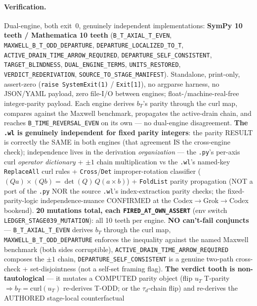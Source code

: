 \paragraph{Verification.}
Dual-engine, both exit~0, genuinely independent implementations: \textbf{SymPy 10
teeth / Mathematica 10 teeth} (\texttt{B\_T\_AXIAL\_T\_EVEN},
\texttt{MAXWELL\_B\_T\_ODD\_DEPARTURE}, \texttt{DEPARTURE\_LOCALIZED\_TO\_T},
\texttt{ACTIVE\_DRAIN\_TIME\_ARROW\_REQUIRED}, \texttt{DEPARTURE\_SELF\_CONSISTENT},
\texttt{TARGET\_BLINDNESS}, \texttt{DUAL\_ENGINE\_TERMS}, \texttt{UNITS\_RESTORED},
\texttt{VERDICT\_REDERIVATION}, \texttt{SOURCE\_TO\_STAGE\_MANIFEST}). Standalone,
print-only, assert-zero (\texttt{raise SystemExit(1)} / \texttt{Exit[1]}), no argparse
harness, no JSON/YAML payload, zero file-I/O between engines; float-/machine-real-free
integer-parity payload. Each engine derives \(b_T\)'s parity through the curl map,
compares against the Maxwell benchmark, propagates the active-drain chain, and reaches
\texttt{B\_TIME\_REVERSAL\_EVEN} on its own --- no dual-engine disagreement. \textbf{The
\texttt{.wl} is genuinely independent for fixed parity integers}: the parity RESULT is
correctly the SAME in both engines (that agreement IS the cross-engine check);
independence lives in the derivation \emph{organization} --- the \texttt{.py}'s
per-axis curl \emph{operator dictionary} + \(\pm1\) chain multiplication vs the
\texttt{.wl}'s named-key \texttt{ReplaceAll} curl rules + \texttt{Cross}/\texttt{Det}
improper-rotation classifier (\((Qa)\times(Qb)=\det(Q)\,Q(a\times b)\)) +
\texttt{FoldList} parity propagation (NOT a port of the \texttt{.py} NOR the source
\texttt{.wl}'s index-extraction parity checks; the fixed-parity-logic
independence-nuance CONFIRMED at the Codex\(\to\)Grok\(\to\)Codex bookend). \textbf{20
mutations total, each \texttt{FIRED\_AT\_OWN\_ASSERT}} (env switch
\texttt{LEDGER\_STAGE039\_MUTATION}): all 10 teeth per engine. \textbf{NO can't-fail
conjuncts} --- \texttt{B\_T\_AXIAL\_T\_EVEN} derives \(b_T\) through the curl map,
\texttt{MAXWELL\_B\_T\_ODD\_DEPARTURE} enforces the inequality against the named Maxwell
benchmark (both sides corruptible), \texttt{ACTIVE\_DRAIN\_TIME\_ARROW\_REQUIRED}
composes the \(\pm1\) chain, \texttt{DEPARTURE\_SELF\_CONSISTENT} is a genuine
two-path cross-check + set-disjointness (not a self-set framing flag). \textbf{The
verdict tooth is non-tautological} --- it mutates a COMPUTED parity object (flip \(u_T\)
T-parity \(\Rightarrow b_T=\text{curl}(u_T)\) re-derives T-ODD; or the \(\tau_d\)-chain
flip) and re-derives the AUTHORED stage-local counterfactual
